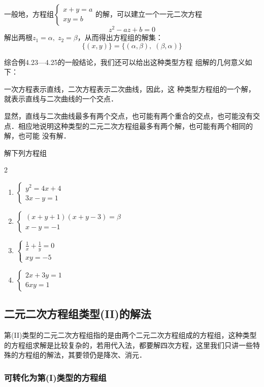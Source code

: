 一般地，方程组$\begin{cases}
x+y=a\\ xy=b
\end{cases}$的解，可以建立一个一元二次方程
\[z^2-az+b=0\]
解出两根$z_1=\alpha,\; z_2=\beta$，从而得出方程组的解集：
\[\{(x,y)\}=\{(\alpha,\beta ),\; (\beta ,\alpha)\}\]

综合例4.23---4.25的一般结论，我们还可以给出这种类型方程
组解的几何意义如下：

一次方程表示直线，二次方程表示二次曲线，因此，这
种类型方程组的一个解，就表示直线与二次曲线的一个交点．

显然，直线与二次曲线最多有两个交点，也可能有两个重合的交点，也可能没有交点．相应地说明这种类型的二元二次方程组最多有两个解，也可能有两个相同的解，也可能
没有解．

\begin{ex}
解下列方程组
\begin{multicols}{2}
\begin{enumerate}
\item $\begin{cases}
y^2=4x+4\\3x-y=1
\end{cases}$
\item $\begin{cases}
(x+y+1)(x+y-3)=\beta\\
x-y=-1
\end{cases}$
\item $\begin{cases}
\frac{1}{x}+\frac{1}{y}=0\\
xy=-5
\end{cases}$
\item $\begin{cases}
2x+3y=1\\ 6xy=1
\end{cases}$
\end{enumerate}
\end{multicols}
\end{ex}

\subsection{二元二次方程组类型(II)的解法}

第(II)类型的二元二次方程组指的是由两个二元二次方程组成的方程组，这种类型的方程组求解是比较复杂的，若用代入法，都要解四次方程，这里我们只讲一些特殊的方程组的解法，其要领仍是降次、消元．

\subsubsection{可转化为第(I)类型的方程组}

